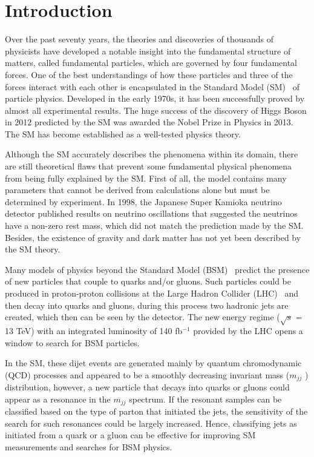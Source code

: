 \documentclass[UTF8,12pt]{ctexart}
\numberwithin{equation}{section}
\def\mjj{$m_{jj}$ }
\def\ifb{fb$^{-1}$ }
\begin{document}
\newpage
{}

\pagestyle{fancy}
\fancyhf{}
\cfoot{$\bm{-\thepage-}$}




\section{Introduction}
\label{sec:1}


\hspace{8mm}
Over the past seventy years, the theories and discoveries of thousands of physicists have developed a notable insight into the fundamental structure of matters, called fundamental particles, which are governed by four fundamental forces. One of the best understandings of how these particles and three of the forces interact with each other is encapsulated in the Standard Model (SM)~\cite{ref1,ref8} of particle physics. Developed in the early 1970s, it has been successfully proved by almost all experimental results. The huge success of the discovery of Higgs Boson in 2012 predicted by the SM was awarded the Nobel Prize in Physics in 2013. The SM has become established as a well-tested physics theory.

Although the SM accurately describes the phenomena within its domain, there are still theoretical flaws that prevent some fundamental physical phenomena from being fully explained by the SM. First of all, the model contains many parameters that cannot be derived from calculations alone but must be determined by experiment. 
In 1998, the Japanese Super Kamioka neutrino detector published results on neutrino oscillations that suggested the neutrinos have a non-zero rest mass, which did not match the prediction made by the SM. Besides, the existence of gravity and dark matter has not yet been described by the SM theory.

Many models of physics beyond the Standard Model (BSM)~\cite{ref9} predict the presence of new particles that couple to quarks and/or gluons. Such particles could be produced in proton-proton collisions at the Large Hadron Collider (LHC)~\cite{Evans:2008zzb} and then decay into quarks and gluons, during this process two hadronic jets are created, which then can be seen by the detector. The new energy regime ($\sqrt{s}$ = 13 TeV) with an integrated luminosity of 140 \ifb provided by the LHC opens a window to search for BSM particles. 

In the SM, these dijet events are generated mainly by quantum chromodynamic (QCD) processes and appeared to be a smoothly decreasing invariant mass (\mjj) distribution, however, a new particle that decays into quarks or gluons could appear as a resonance in the \mjj spectrum. If the resonant samples can be classified based on the type of parton that initiated the jets, the sensitivity of the search for such resonances could be largely increased. Hence, classifying jets as initiated from a quark or a gluon can be effective for improving SM measurements and searches for BSM physics. 
\end{document}
